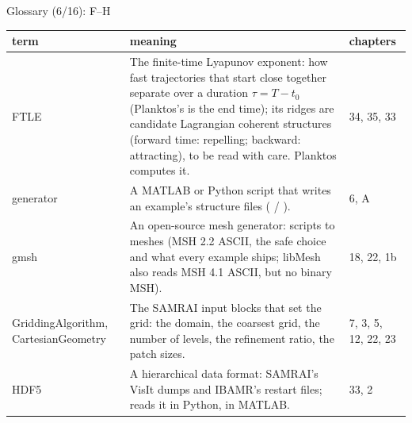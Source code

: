 \documentclass[aspectratio=169,11pt]{beamer}
\makeatletter
\newenvironment{glossarytable}{\scriptsize\renewcommand{\arraystretch}{1.08}%
  \begin{tabular}{@{}L{0.19\textwidth}L{0.63\textwidth}L{0.12\textwidth}@{}}\toprule
  term & meaning & chapters\\\midrule}{\bottomrule\end{tabular}}
\makeatother
\begin{document}
\begin{frame}{Glossary (6/16): F--H}
\label{fr:g6}
\begin{glossarytable}
FTLE & The finite-time Lyapunov exponent: how fast trajectories that start close together separate over a duration $\tau = T - t_0$ (Planktos's  is the end time); its ridges are candidate Lagrangian coherent structures (forward time: repelling; backward: attracting), to be read with care. Planktos computes it. & 34, 35, 33\\
generator & A MATLAB or Python script that writes an example's structure files ( / ). & 6, A\\
gmsh & An open-source mesh generator:  scripts to  meshes (MSH 2.2 ASCII, the safe choice and what every example ships; libMesh also reads MSH 4.1 ASCII, but no binary MSH). & 18, 22, 1b\\
GriddingAlgorithm, CartesianGeometry & The SAMRAI input blocks that set the grid: the domain, the coarsest grid, the number of levels, the refinement ratio, the patch sizes. & 7, 3, 5, 12, 22, 23\\
HDF5 & A hierarchical data format: SAMRAI's VisIt dumps and IBAMR's restart files;  reads it in Python,  in MATLAB. & 33, 2\\
\end{glossarytable}
\end{frame}
\end{document}
